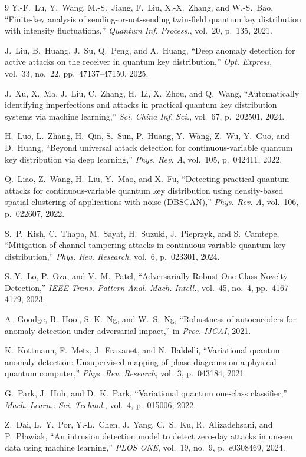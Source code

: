 \documentclass[12pt, a4paper]{report}
\begin{document}
\begin{thebibliography}{9}
Y.-F.~Lu, Y.~Wang, M.-S.~Jiang, F.~Liu, X.-X.~Zhang, and W.-S.~Bao,
``Finite-key analysis of sending-or-not-sending twin-field quantum key distribution with intensity fluctuations,''
\textit{Quantum Inf. Process.}, vol.~20, p.~135, 2021.
 
J.~Liu, B.~Huang, J.~Su, Q.~Peng, and A.~Huang,
``Deep anomaly detection for active attacks on the receiver in quantum key distribution,''
\textit{Opt. Express}, vol.~33, no.~22, pp.~47137--47150, 2025.
 
J.~Xu, X.~Ma, J.~Liu, C.~Zhang, H.~Li, X.~Zhou, and Q.~Wang,
``Automatically identifying imperfections and attacks in practical quantum key distribution systems via machine learning,''
\textit{Sci. China Inf. Sci.}, vol.~67, p.~202501, 2024.
 
H.~Luo, L.~Zhang, H.~Qin, S.~Sun, P.~Huang, Y.~Wang, Z.~Wu, Y.~Guo, and D.~Huang,
``Beyond universal attack detection for continuous-variable quantum key distribution via deep learning,''
\textit{Phys. Rev. A}, vol.~105, p.~042411, 2022.
 
Q.~Liao, Z.~Wang, H.~Liu, Y.~Mao, and X.~Fu,
``Detecting practical quantum attacks for continuous-variable quantum key distribution using density-based spatial clustering of applications with noise (DBSCAN),''
\textit{Phys. Rev. A}, vol.~106, p.~022607, 2022.
 
S.~P.~Kish, C.~Thapa, M.~Sayat, H.~Suzuki, J.~Pieprzyk, and S.~Camtepe,
``Mitigation of channel tampering attacks in continuous-variable quantum key distribution,''
\textit{Phys. Rev. Research}, vol.~6, p.~023301, 2024.
 
S.-Y.~Lo, P.~Oza, and V.~M.~Patel,
``Adversarially Robust One-Class Novelty Detection,''
\textit{IEEE Trans. Pattern Anal. Mach. Intell.}, vol.~45, no.~4, pp.~4167--4179, 2023.
 
A.~Goodge, B.~Hooi, S.-K.~Ng, and W.~S.~Ng,
``Robustness of autoencoders for anomaly detection under adversarial impact,''
in \textit{Proc. IJCAI}, 2021.
 
K.~Kottmann, F.~Metz, J.~Fraxanet, and N.~Baldelli,
``Variational quantum anomaly detection: Unsupervised mapping of phase diagrams on a physical quantum computer,''
\textit{Phys. Rev. Research}, vol.~3, p.~043184, 2021.
 
G.~Park, J.~Huh, and D.~K.~Park,
``Variational quantum one-class classifier,''
\textit{Mach. Learn.: Sci. Technol.}, vol.~4, p.~015006, 2022.
 
Z.~Dai, L.~Y.~Por, Y.-L.~Chen, J.~Yang, C.~S.~Ku, R.~Alizadehsani, and P.~P{\l}awiak,
``An intrusion detection model to detect zero-day attacks in unseen data using machine learning,''
\textit{PLOS ONE}, vol.~19, no.~9, p.~e0308469, 2024.
 
\end{thebibliography}
\end{document}
